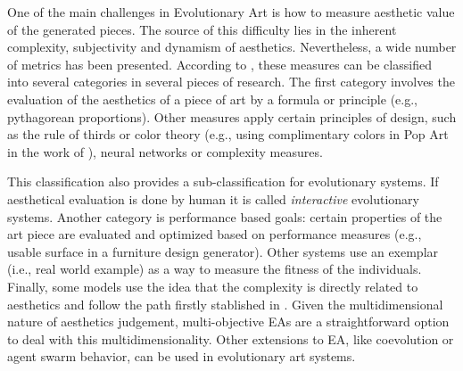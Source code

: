 One of the main challenges in Evolutionary Art is how to measure
aesthetic value of the generated pieces. The source of this difficulty
lies in the inherent complexity, subjectivity and dynamism of
aesthetics. Nevertheless, a wide number of metrics has been
presented. According to 
\cite{galanter2012computational}, these measures can be classified
into several categories in several pieces of research. The first
category involves the evaluation of the aesthetics of a piece of art
by a formula or principle (e.g., pythagorean proportions). Other
measures apply certain principles of design, such as the rule of
thirds or color theory (e.g., using complimentary colors in Pop Art in
the work of  \cite{den2012evolving}),
neural networks or complexity measures.   %

This classification also provides a sub-classification for
evolutionary systems. If aesthetical evaluation is done by human it is
called {\em interactive} evolutionary systems. Another category is
performance %
 based goals: certain properties of the art piece are evaluated and
 optimized based on performance measures (e.g., usable surface in a
 furniture design generator). Other systems use an exemplar (i.e.,
 real world example) as a way to measure the fitness of the
 individuals. %
 Finally, some models use the idea that the complexity is directly
 related to aesthetics and follow the path firstly stablished in
 \cite{birkhoff2003aesthetic}.  Given the multidimensional nature of
 aesthetics judgement, multi-objective EAs are a straightforward
 option to deal with this multidimensionality. %
 Other extensions to EA, like coevolution or agent swarm behavior, can
 be used in evolutionary art systems. %

